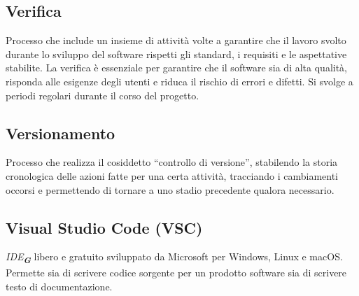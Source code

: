 \hypertarget{sec:verifica}{}
\subsection*{Verifica}
Processo che include un insieme di attività volte a garantire che il lavoro svolto durante lo sviluppo del software rispetti gli standard, i requisiti e 
le aspettative stabilite. La verifica è essenziale per garantire che il software sia di alta qualità, risponda alle esigenze degli utenti e riduca il 
rischio di errori e difetti. Si svolge a periodi regolari durante il corso del progetto.

\subsection*{Versionamento}
Processo che realizza il cosiddetto “controllo di versione”, stabilendo la storia cronologica delle azioni fatte per una certa attività, tracciando i 
cambiamenti occorsi e permettendo di tornare a uno stadio precedente qualora necessario.

\hypertarget{sec:VSC}{}
\subsection*{Visual Studio Code (VSC)}
\emph{IDE}\textsubscript{\textit{\textbf{G}}} libero e gratuito sviluppato da Microsoft per Windows, Linux e macOS. Permette sia di scrivere codice 
sorgente per un prodotto software sia di scrivere testo di documentazione.

\newpage